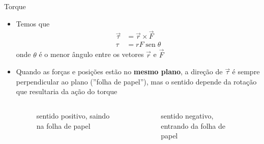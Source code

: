 \documentclass[t,%
brazilian,%
11pt,%
aspectratio=169,%
table%
]{beamer}
\DeclareMathOperator{\sen}{sen}
\begin{document}
\begin{frame}{Torque}
    \begin{itemize}
        \item Temos que
            \begin{align*}
                \vec{\tau} &= \vec{r} \times \vec{F} \\
                \tau &= r F \sen{\theta}
            \end{align*}
            onde \(\theta\) é o menor ângulo entre os vetores \(\vec{r}\) e \(\vec{F}\)
        \item Quando as forças e posições estão no \textbf{mesmo plano},
            a direção de \(\vec{\tau}\) é sempre perpendicular ao plano (''folha de papel''), mas o sentido depende da
            rotação que resultaria da ação do torque
            \begin{columns}
                \begin{column}{0.4\textwidth}
                    \begin{figure}
                        \caption{sentido positivo, saindo na folha de papel}
                    \end{figure}
                \end{column}

                \begin{column}{0.4\textwidth}
                    \begin{figure}
                        \caption{sentido negativo, entrando da folha de papel}
                    \end{figure}
                \end{column}

            \end{columns}
    \end{itemize}
\end{frame}
\end{document}
